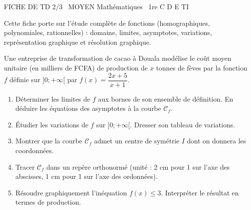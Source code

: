 \documentclass[11pt]{article}
\begin{document}
\begin{tcolorbox}[enhanced,colback=popink,colframe=popink,arc=10pt,boxrule=0pt,left=12pt,right=12pt,top=9pt,bottom=9pt]
{\color{white}\popxbold\small FICHE DE TD 2/3 \textbullet\ MOYEN \hfill Mathématiques \textbullet\ 1re C D E TI\par}
\end{tcolorbox}
\vspace{4pt}
Cette fiche porte sur l'étude complète de fonctions (homographiques, polynomiales, rationnelles) : domaine, limites, asymptotes, variations, représentation graphique et résolution graphique.

\begin{exercice}
Une entreprise de transformation de cacao à Douala modélise le coût moyen unitaire (en milliers de FCFA) de production de $x$ tonnes de fèves par la fonction $f$ définie sur $]0; +\infty[$ par $f(x) = \dfrac{2x + 5}{x + 1}$.
\begin{enumerate}
    \item Déterminer les limites de $f$ aux bornes de son ensemble de définition. En déduire les équations des asymptotes à la courbe $\mathcal{C}_f$.
    \item Étudier les variations de $f$ sur $]0; +\infty[$. Dresser son tableau de variations.
    \item Montrer que la courbe $\mathcal{C}_f$ admet un centre de symétrie $I$ dont on donnera les coordonnées.
    \item Tracer $\mathcal{C}_f$ dans un repère orthonormé (unité : 2 cm pour 1 sur l'axe des abscisses, 1 cm pour 1 sur l'axe des ordonnées).
    \item Résoudre graphiquement l'inéquation $f(x) \leqslant 3$. Interpréter le résultat en termes de production.
\end{enumerate}
\end{exercice}
\end{document}
